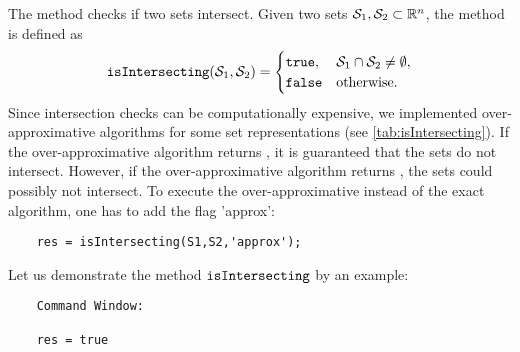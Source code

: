 The method  checks if two sets intersect. Given two sets $\mathcal{S}_1,\mathcal{S}_2 \subset \mathbb{R}^n$, the method  is defined as
	\begin{equation*}
		{\normalfont \texttt{isIntersecting}}(\mathcal{S}_1,\mathcal{S}_2) =
		\begin{cases}
			{\normalfont \texttt{true}}, & \mathcal{S}_1 \cap \mathcal{S}_2 \neq \emptyset, \\
			{\normalfont \texttt{false}} & \mathrm{otherwise}.
		\end{cases}
	\end{equation*}	
Since intersection checks can be computationally expensive, we implemented over-approximative algorithms for some set representations (see \cref{tab:isIntersecting}). If the over-approximative algorithm returns , it is guaranteed that the sets do not intersect. However, if the over-approximative algorithm returns , the sets could possibly not intersect. To execute the over-approximative instead of the exact algorithm, one has to add the flag 'approx':
\begin{verbatim}
	res = isIntersecting(S1,S2,'approx');
\end{verbatim}

Let us demonstrate the method ${\normalfont \texttt{isIntersecting}}$ by an example:

\begin{center}
\begin{minipage}[t]{0.40\textwidth}
	\vspace{10pt}
	\footnotesize
	
\end{minipage}
\begin{minipage}[t]{0.2\textwidth}
	\vspace{10pt}

	\begin{verbatim}
	Command Window:
		
	res = true
	\end{verbatim}
\end{minipage}
\begin{minipage}[t]{0.3\textwidth}
	\vspace{0pt}
	\centering
\end{minipage}
\end{center}

